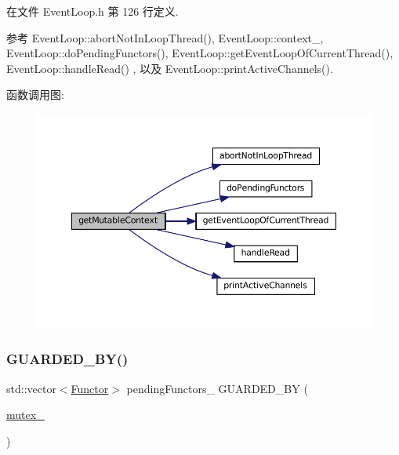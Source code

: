 在文件 Event\+Loop.\+h 第 126 行定义.



参考 Event\+Loop\+::abort\+Not\+In\+Loop\+Thread(), Event\+Loop\+::context\+\_\+, Event\+Loop\+::do\+Pending\+Functors(), Event\+Loop\+::get\+Event\+Loop\+Of\+Current\+Thread(), Event\+Loop\+::handle\+Read() , 以及 Event\+Loop\+::print\+Active\+Channels().

函数调用图\+:
\nopagebreak
\begin{figure}[H]
\begin{center}
\leavevmode
\includegraphics[width=350pt]{classmuduo_1_1net_1_1EventLoop_aca752855bdbb8cc6b18d05be1286b8f1_cgraph}
\end{center}
\end{figure}
\mbox{\label{classmuduo_1_1net_1_1EventLoop_a0107071979d65e26a8c7d1d7131af35e}} 
\subsubsection{\texorpdfstring{G\+U\+A\+R\+D\+E\+D\+\_\+\+B\+Y()}{GUARDED\_BY()}}
{\footnotesize\ttfamily std\+::vector$<$\hyperlink{classmuduo_1_1net_1_1EventLoop_a322d335989ca5098875638110aafba84}{Functor}$>$ pending\+Functors\+\_\+ G\+U\+A\+R\+D\+E\+D\+\_\+\+BY (\begin{DoxyParamCaption}\item[{\hyperlink{classmuduo_1_1net_1_1EventLoop_a6e1bf1809a42f40f1a21178dc6620a6f}{mutex\+\_\+}}]{ }\end{DoxyParamCaption})\hspace{0.3cm}{\ttfamily [private]}}

